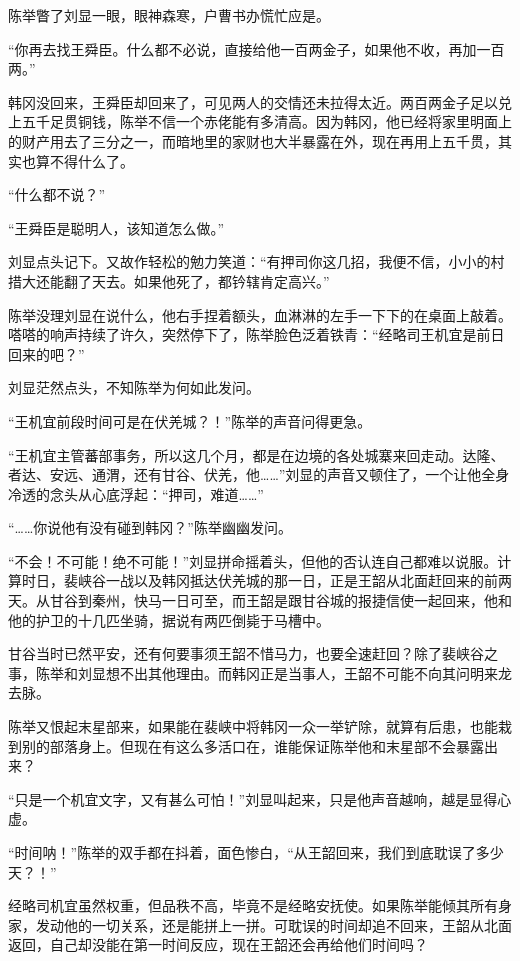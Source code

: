 陈举瞥了刘显一眼，眼神森寒，户曹书办慌忙应是。

“你再去找王舜臣。什么都不必说，直接给他一百两金子，如果他不收，再加一百两。”

韩冈没回来，王舜臣却回来了，可见两人的交情还未拉得太近。两百两金子足以兑上五千足贯铜钱，陈举不信一个赤佬能有多清高。因为韩冈，他已经将家里明面上的财产用去了三分之一，而暗地里的家财也大半暴露在外，现在再用上五千贯，其实也算不得什么了。

“什么都不说？”

“王舜臣是聪明人，该知道怎么做。”

刘显点头记下。又故作轻松的勉力笑道：“有押司你这几招，我便不信，小小的村措大还能翻了天去。如果他死了，都钤辖肯定高兴。”

陈举没理刘显在说什么，他右手捏着额头，血淋淋的左手一下下的在桌面上敲着。嗒嗒的响声持续了许久，突然停下了，陈举脸色泛着铁青：“经略司王机宜是前日回来的吧？”

刘显茫然点头，不知陈举为何如此发问。

“王机宜前段时间可是在伏羌城？！”陈举的声音问得更急。

“王机宜主管蕃部事务，所以这几个月，都是在边境的各处城寨来回走动。达隆、者达、安远、通渭，还有甘谷、伏羌，他……”刘显的声音又顿住了，一个让他全身冷透的念头从心底浮起：“押司，难道……”

“……你说他有没有碰到韩冈？”陈举幽幽发问。

“不会！不可能！绝不可能！”刘显拼命摇着头，但他的否认连自己都难以说服。计算时日，裴峡谷一战以及韩冈抵达伏羌城的那一日，正是王韶从北面赶回来的前两天。从甘谷到秦州，快马一日可至，而王韶是跟甘谷城的报捷信使一起回来，他和他的护卫的十几匹坐骑，据说有两匹倒毙于马槽中。

甘谷当时已然平安，还有何要事须王韶不惜马力，也要全速赶回？除了裴峡谷之事，陈举和刘显想不出其他理由。而韩冈正是当事人，王韶不可能不向其问明来龙去脉。

陈举又恨起末星部来，如果能在裴峡中将韩冈一众一举铲除，就算有后患，也能栽到别的部落身上。但现在有这么多活口在，谁能保证陈举他和末星部不会暴露出来？

“只是一个机宜文字，又有甚么可怕！”刘显叫起来，只是他声音越响，越是显得心虚。

“时间呐！”陈举的双手都在抖着，面色惨白，“从王韶回来，我们到底耽误了多少天？！”

经略司机宜虽然权重，但品秩不高，毕竟不是经略安抚使。如果陈举能倾其所有身家，发动他的一切关系，还是能拼上一拼。可耽误的时间却追不回来，王韶从北面返回，自己却没能在第一时间反应，现在王韶还会再给他们时间吗？

